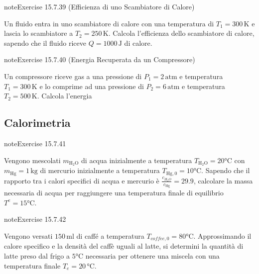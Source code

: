 \documentclass[letterpaper,10pt,italian]{jupyterBook}
\begin{document}
\begin{sphinxadmonition}{note}{Exercise 15.7.39 (Efficienza di uno Scambiatore di Calore)}



\sphinxAtStartPar
Un fluido entra in uno scambiatore di calore con una temperatura di \(T_1 = 300 \, \text{K}\) e lascia lo scambiatore a \(T_2 = 250 \, \text{K}\). Calcola l’efficienza dello scambiatore di calore, sapendo che il fluido riceve \(Q = 1000 \, \text{J}\) di calore.
\end{sphinxadmonition}
 \label{exercise:ch/thermodynamics/principles-problems-exercise-39}

\begin{sphinxadmonition}{note}{Exercise 15.7.40 (Energia Recuperata da un Compressore)}



\sphinxAtStartPar
Un compressore riceve gas a una pressione di \(P_1 = 2 \, \text{atm}\) e temperatura \(T_1 = 300 \, \text{K}\) e lo comprime ad una pressione di \(P_2 = 6 \, \text{atm}\) e temperatura \(T_2 = 500 \, \text{K}\). Calcola l’energia
\end{sphinxadmonition}


\subsection{Calorimetria}
\label{\detokenize{ch/thermodynamics/principles-problems:calorimetria}} \label{exercise:ch/thermodynamics/principles-problems-exercise-40}

\begin{sphinxadmonition}{note}{Exercise 15.7.41}



\sphinxAtStartPar
Vengono mescolati \(m_{\text{H}_2\text{O}}\) di acqua inizialmente a temperatura \(T_{\text{H}_2\text{O}} = 20 \text{°C}\) con \(m_{\text{Hg}} = 1 \, \text{kg}\) di mercurio inizialmente a temperatura \(T_{\text{Hg},0} = 10 \text{°C}\). Sapendo che il rapporto tra i calori specifici di acqua e mercurio è \(\frac{c_{H_2 O}}{c_{\text{Hg}}} = 29.9\), calcolare la massa necessaria di acqua per raggiungere una temperatura finale di equilibrio \(T^{e} = 15 \text{°C}\).
\end{sphinxadmonition}
 \label{exercise:ch/thermodynamics/principles-problems-exercise-41}

\begin{sphinxadmonition}{note}{Exercise 15.7.42}



\sphinxAtStartPar
Vengono versati \(150 \, \text{ml}\) di caffé a temperatura \(T_{coffee,0} = 80 \text{°C}\). Approssimando il calore specifico e la densità del caffè uguali al latte, si determini la quantità di latte preso dal frigo a \(5 \text{°C}\) necessaria per ottenere una miscela con una temperatura finale \(T_e = 20 \, \text{°C}\).
\end{sphinxadmonition}
 \label{exercise:ch/thermodynamics/principles-problems-exercise-42}
\end{document}
